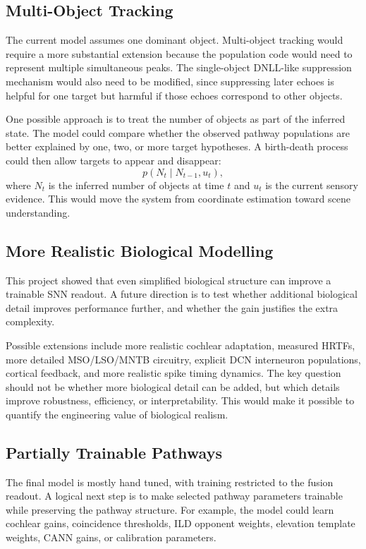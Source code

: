 \subsection{Multi-Object Tracking}

The current model assumes one dominant object. Multi-object tracking would require a more substantial extension because the population code would need to represent multiple simultaneous peaks. The single-object DNLL-like suppression mechanism would also need to be modified, since suppressing later echoes is helpful for one target but harmful if those echoes correspond to other objects.

One possible approach is to treat the number of objects as part of the inferred state. The model could compare whether the observed pathway populations are better explained by one, two, or more target hypotheses. A birth-death process could then allow targets to appear and disappear:
\begin{equation}
    p(N_t \mid N_{t-1}, u_t),
\end{equation}
where $N_t$ is the inferred number of objects at time $t$ and $u_t$ is the current sensory evidence. This would move the system from coordinate estimation toward scene understanding.

\subsection{More Realistic Biological Modelling}

This project showed that even simplified biological structure can improve a trainable SNN readout. A future direction is to test whether additional biological detail improves performance further, and whether the gain justifies the extra complexity.

Possible extensions include more realistic cochlear adaptation, measured HRTFs, more detailed MSO/LSO/MNTB circuitry, explicit DCN interneuron populations, cortical feedback, and more realistic spike timing dynamics. The key question should not be whether more biological detail can be added, but which details improve robustness, efficiency, or interpretability. This would make it possible to quantify the engineering value of biological realism.

\subsection{Partially Trainable Pathways}

The final model is mostly hand tuned, with training restricted to the fusion readout. A logical next step is to make selected pathway parameters trainable while preserving the pathway structure. For example, the model could learn cochlear gains, coincidence thresholds, ILD opponent weights, elevation template weights, CANN gains, or calibration parameters.

